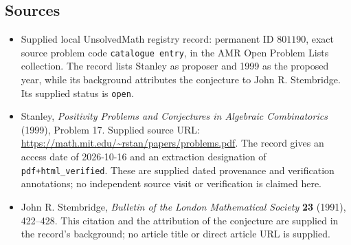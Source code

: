 \documentclass[11pt]{article}
\begin{document}
\subsection{Sources}
\begin{itemize}
\item Supplied local UnsolvedMath registry record: permanent ID \(801190\), exact source problem code \texttt{catalogue entry}, in the AMR Open Problem Lists collection. The record lists Stanley as proposer and 1999 as the proposed year, while its background attributes the conjecture to John R. Stembridge. Its supplied status is \texttt{open}.
\item Stanley, \emph{Positivity Problems and Conjectures in Algebraic Combinatorics} (1999), Problem 17. Supplied source URL: \url{https://math.mit.edu/~rstan/papers/problems.pdf}. The record gives an access date of 2026-10-16 and an extraction designation of \texttt{pdf+html\_verified}. These are supplied dated provenance and verification annotations; no independent source visit or verification is claimed here.
\item John R. Stembridge, \emph{Bulletin of the London Mathematical Society} \textbf{23} (1991), 422--428. This citation and the attribution of the conjecture are supplied in the record's background; no article title or direct article URL is supplied.
\end{itemize}
\end{document}
